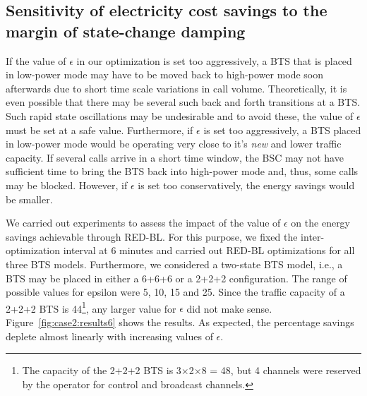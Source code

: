 \subsection{Sensitivity of electricity cost savings to the margin of state-change damping} %
\label{subsec:case2:results:epsilon} If the value of $\epsilon$ in our optimization is set too aggressively, a BTS that is placed in low-power mode may have to be moved back to high-power mode soon afterwards due to short time scale variations in call volume. Theoretically, it is even possible that there may be several such back and forth transitions at a BTS. Such rapid state oscillations may be undesirable and to avoid these, the value of $\epsilon$ must be set at a safe value. Furthermore, if $\epsilon$ is set too aggressively, a BTS placed in low-power mode would be operating very close to it's \textit{new} and lower traffic capacity. If several calls arrive in a short time window, the BSC may not have sufficient time to bring the BTS back into high-power mode and, thus, some calls may be blocked. However, if $\epsilon$ is set too conservatively, the energy savings would be smaller. 

We carried out experiments to assess the impact of the value of $\epsilon$ on the energy savings achievable through RED-BL. For this purpose, we fixed the inter-optimization interval at 6 minutes and carried out RED-BL optimizations for all three BTS models. Furthermore, we considered a two-state BTS model, i.e., a BTS may be placed in either a 6+6+6 or a 2+2+2 configuration. The range of possible values for epsilon were 5, 10, 15 and 25. Since the traffic capacity of a 2+2+2 BTS is 44\footnote{The capacity of the 2+2+2 BTS is 3$\times$2$\times$8 = 48, but 4 channels were reserved by the operator for control and broadcast channels.}, any larger value for $\epsilon$ did not make sense. Figure~\ref{fig:case2:results6} shows the results. As expected, the percentage savings deplete almost linearly with increasing values of $\epsilon$.


